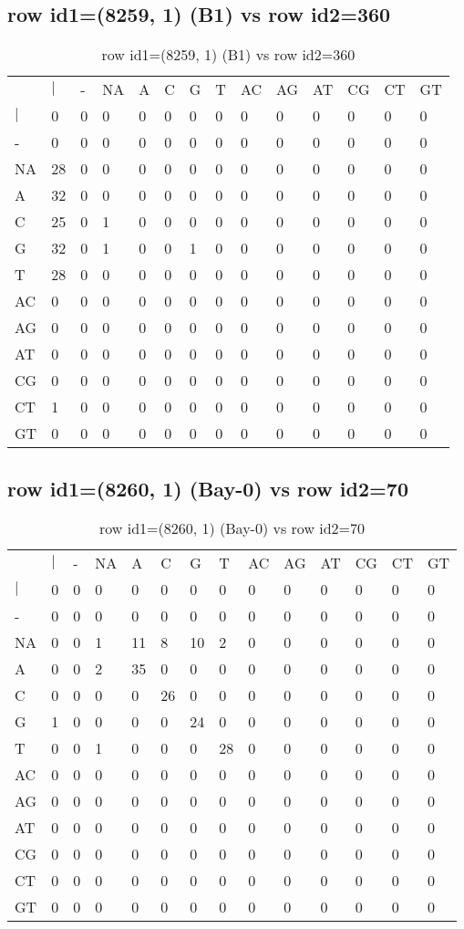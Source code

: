 \subsection{row id1=(8259, 1) (B1) vs row id2=360}
\begin{center}
\begin{longtable}{|l|l|l|l|l|l|l|l|l|l|l|l|l|l|}
\caption{row id1=(8259, 1) (B1) vs row id2=360} \label{table_dm404}\\
\hline
\\
\hline
&$|$&-&NA&A&C&G&T&AC&AG&AT&CG&CT&GT\\
$|$&0&0&0&0&0&0&0&0&0&0&0&0&0\\
-&0&0&0&0&0&0&0&0&0&0&0&0&0\\
NA&28&0&0&0&0&0&0&0&0&0&0&0&0\\
A&32&0&0&0&0&0&0&0&0&0&0&0&0\\
C&25&0&1&0&0&0&0&0&0&0&0&0&0\\
G&32&0&1&0&0&1&0&0&0&0&0&0&0\\
T&28&0&0&0&0&0&0&0&0&0&0&0&0\\
AC&0&0&0&0&0&0&0&0&0&0&0&0&0\\
AG&0&0&0&0&0&0&0&0&0&0&0&0&0\\
AT&0&0&0&0&0&0&0&0&0&0&0&0&0\\
CG&0&0&0&0&0&0&0&0&0&0&0&0&0\\
CT&1&0&0&0&0&0&0&0&0&0&0&0&0\\
GT&0&0&0&0&0&0&0&0&0&0&0&0&0\\
\hline
\end{longtable}
\end{center}

\subsection{row id1=(8260, 1) (Bay-0) vs row id2=70}
\begin{center}
\begin{longtable}{|l|l|l|l|l|l|l|l|l|l|l|l|l|l|}
\caption{row id1=(8260, 1) (Bay-0) vs row id2=70} \label{table_dm406}\\
\hline
\\
\hline
&$|$&-&NA&A&C&G&T&AC&AG&AT&CG&CT&GT\\
$|$&0&0&0&0&0&0&0&0&0&0&0&0&0\\
-&0&0&0&0&0&0&0&0&0&0&0&0&0\\
NA&0&0&1&11&8&10&2&0&0&0&0&0&0\\
A&0&0&2&35&0&0&0&0&0&0&0&0&0\\
C&0&0&0&0&26&0&0&0&0&0&0&0&0\\
G&1&0&0&0&0&24&0&0&0&0&0&0&0\\
T&0&0&1&0&0&0&28&0&0&0&0&0&0\\
AC&0&0&0&0&0&0&0&0&0&0&0&0&0\\
AG&0&0&0&0&0&0&0&0&0&0&0&0&0\\
AT&0&0&0&0&0&0&0&0&0&0&0&0&0\\
CG&0&0&0&0&0&0&0&0&0&0&0&0&0\\
CT&0&0&0&0&0&0&0&0&0&0&0&0&0\\
GT&0&0&0&0&0&0&0&0&0&0&0&0&0\\
\hline
\end{longtable}
\end{center}

